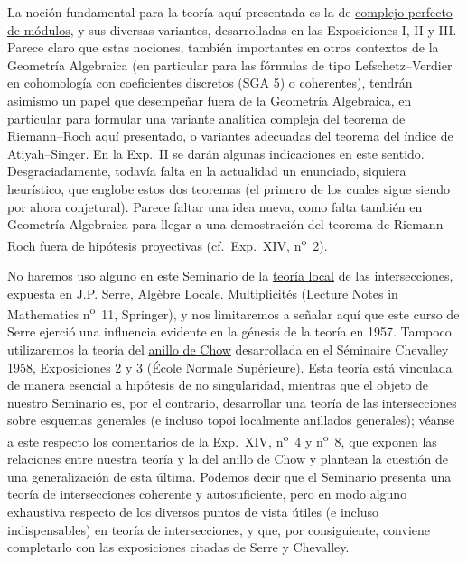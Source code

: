 \documentclass[11pt]{article}
\begin{document}
La noción fundamental para la teoría aquí presentada es la de
\underline{complejo perfecto de módulos}, y sus diversas variantes,
desarrolladas en las Exposiciones I, II y III. Parece claro que estas nociones,
también importantes en otros contextos de la Geometría Algebraica (en
particular para las fórmulas de tipo Lefschetz--Verdier en cohomología con
coeficientes discretos (SGA 5) o coherentes), tendrán asimismo un papel que
desempeñar fuera de la Geometría Algebraica, en particular para formular una
variante analítica compleja del teorema de Riemann--Roch aquí presentado, o
variantes adecuadas del teorema del índice de Atiyah--Singer. En la Exp.\ II
se darán algunas indicaciones en este sentido. Desgraciadamente, todavía
falta en la actualidad un enunciado, siquiera heurístico, que englobe estos
dos teoremas (el primero de los cuales sigue siendo por ahora conjetural).
Parece faltar una idea nueva, como falta también en Geometría Algebraica para
llegar a una demostración del teorema de Riemann--Roch fuera de hipótesis
proyectivas (cf.\ Exp.\ XIV, n\textsuperscript{o}~2).

No haremos uso alguno en este Seminario de la \underline{teoría local} de las
intersecciones, expuesta en J.P. Serre, Algèbre Locale. Multiplicités (Lecture
Notes in Mathematics n\textsuperscript{o}~11, Springer), y nos limitaremos a
señalar aquí que este curso de Serre ejerció una influencia evidente en la
génesis de la teoría en 1957. Tampoco utilizaremos la teoría del
\underline{anillo de Chow} desarrollada en el Séminaire Chevalley 1958,
Exposiciones 2 y 3 (École Normale Supérieure). Esta teoría está vinculada de
manera esencial a hipótesis de no singularidad, mientras que el objeto de
nuestro Seminario es, por el contrario, desarrollar una teoría de las
intersecciones sobre esquemas generales (e incluso topoi localmente anillados
generales); véanse a este respecto los comentarios de la Exp.\ XIV,
n\textsuperscript{o}~4 y n\textsuperscript{o}~8, que exponen las relaciones
entre nuestra teoría y la del anillo de Chow y plantean la cuestión de una
generalización de esta última. Podemos decir que el Seminario presenta una
teoría de intersecciones coherente y autosuficiente, pero en modo alguno
exhaustiva respecto de los diversos puntos de vista útiles (e incluso
indispensables) en teoría de intersecciones, y que, por consiguiente, conviene
completarlo con las exposiciones citadas de Serre y Chevalley.
\end{document}
